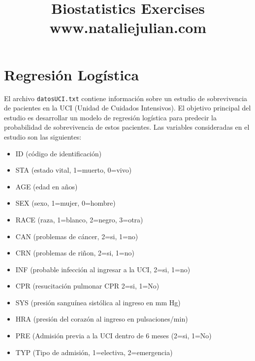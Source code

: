 \documentclass[11pt,onside]{article}
\title{\blue Biostatistics Exercises \\
\blueb www.nataliejulian.com}
\author{}
\date{} %
\begin{document}


\maketitle


\section*{Regresión Logística}

El archivo \texttt{datosUCI.txt} contiene información sobre un estudio de sobrevivencia de pacientes en la UCI (Unidad de Cuidados Intensivos). El objetivo principal del estudio es desarrollar un modelo de regresión logística para predecir la probabilidad de sobrevivencia de estos pacientes. Las variables consideradas en el estudio son las siguientes:

\begin{itemize}

\item ID (código de identificación)

\item STA (estado vital, 1=muerto, 0=vivo)

\item AGE (edad en años)

\item SEX (sexo, 1=mujer, 0=hombre)

\item RACE (raza, 1=blanco, 2=negro, 3=otra)

\item CAN (problemas de cáncer, 2=si, 1=no)

\item CRN (problemas de riñon, 2=si, 1=no)

\item INF (probable infección al ingresar a la UCI, 2=si, 1=no)

\item CPR (resucitación pulmonar CPR 2=si, 1=No)

\item SYS (presión sanguínea sistólica al ingreso en mm Hg)

\item HRA (presión del corazón al ingreso en pulsaciones/min)

\item PRE (Admisión previa a la UCI dentro de 6 meses (2=si, 1=No)

\item TYP (Tipo de admisión, 1=electiva, 2=emergencia)

\end{itemize}
\end{document}
